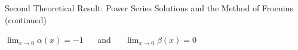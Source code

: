 \documentclass{beamer}
\begin{document}
\begin{frame}{Second Theoretical Result: Power Series Solutions and the Method of Froenius (continued)}
\begin{enumerate}
\begin{center}

\begin{minipage}{7cm}

\begin{varblock}[7cm]

$\lim_{x \to 0} \alpha(x)=-1$ $\quad$ and $\quad$ $\lim_{x \to 0} \beta(x)=0$

\end{varblock}

\end{minipage}

\end{center}

\asuivre

\end{enumerate}

\end{frame}
\end{document}
